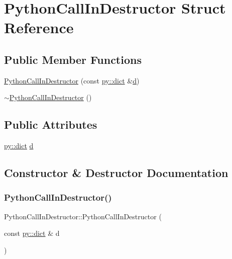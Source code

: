 \hypertarget{struct_python_call_in_destructor}{}\section{Python\+Call\+In\+Destructor Struct Reference}
\label{struct_python_call_in_destructor}
\subsection*{Public Member Functions}
\begin{DoxyCompactItemize}
\item 
\mbox{\hyperlink{struct_python_call_in_destructor_a3bd241ae5d0c2432978dd95c10f8c908}{Python\+Call\+In\+Destructor}} (const \mbox{\hyperlink{pyerrors_8h_a9a67a16ee8134b9b5325f6f10bf62b32}{py\+::dict}} \&\mbox{\hyperlink{struct_python_call_in_destructor_a31f3a6f3e208e088742f96db98bbb553}{d}})
\item 
\mbox{\hyperlink{struct_python_call_in_destructor_a11090c7ca44f6e43bad3a03412c82dbd}{$\sim$\+Python\+Call\+In\+Destructor}} ()
\end{DoxyCompactItemize}
\subsection*{Public Attributes}
\begin{DoxyCompactItemize}
\item 
\mbox{\hyperlink{pyerrors_8h_a9a67a16ee8134b9b5325f6f10bf62b32}{py\+::dict}} \mbox{\hyperlink{struct_python_call_in_destructor_a31f3a6f3e208e088742f96db98bbb553}{d}}
\end{DoxyCompactItemize}


\subsection{Constructor \& Destructor Documentation}
\mbox{\label{struct_python_call_in_destructor_a3bd241ae5d0c2432978dd95c10f8c908}} 
\subsubsection{\texorpdfstring{PythonCallInDestructor()}{PythonCallInDestructor()}}
{\footnotesize\ttfamily Python\+Call\+In\+Destructor\+::\+Python\+Call\+In\+Destructor (\begin{DoxyParamCaption}\item[{const \mbox{\hyperlink{pyerrors_8h_a9a67a16ee8134b9b5325f6f10bf62b32}{py\+::dict}} \&}]{d }\end{DoxyParamCaption})\hspace{0.3cm}{\ttfamily [inline]}}

